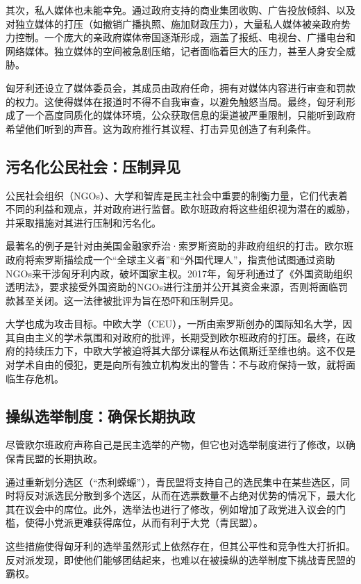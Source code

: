 其次，私人媒体也未能幸免。通过政府支持的商业集团收购、广告投放倾斜、以及对独立媒体的打压（如撤销广播执照、施加财政压力），大量私人媒体被亲政府势力控制。一个庞大的亲政府媒体帝国逐渐形成，涵盖了报纸、电视台、广播电台和网络媒体。独立媒体的空间被急剧压缩，记者面临着巨大的压力，甚至人身安全威胁。

匈牙利还设立了媒体委员会，其成员由政府任命，拥有对媒体内容进行审查和罚款的权力。这使得媒体在报道时不得不自我审查，以避免触怒当局。最终，匈牙利形成了一个高度同质化的媒体环境，公众获取信息的渠道被严重限制，只能听到政府希望他们听到的声音。这为政府推行其议程、打击异见创造了有利条件。

\subsection{污名化公民社会：压制异见}

公民社会组织（NGOs）、大学和智库是民主社会中重要的制衡力量，它们代表着不同的利益和观点，并对政府进行监督。欧尔班政府将这些组织视为潜在的威胁，并采取措施对其进行压制和污名化。

最著名的例子是针对由美国金融家乔治·索罗斯资助的非政府组织的打击。欧尔班政府将索罗斯描绘成一个“全球主义者”和“外国代理人”，指责他试图通过资助NGOs来干涉匈牙利内政，破坏国家主权。2017年，匈牙利通过了《外国资助组织透明法》，要求接受外国资助的NGOs进行注册并公开其资金来源，否则将面临罚款甚至关闭。这一法律被批评为旨在恐吓和压制异见。

大学也成为攻击目标。中欧大学（CEU），一所由索罗斯创办的国际知名大学，因其自由主义的学术氛围和对政府的批评，长期受到欧尔班政府的打压。最终，在政府的持续压力下，中欧大学被迫将其大部分课程从布达佩斯迁至维也纳。这不仅是对学术自由的侵犯，更是向所有独立机构发出的警告：不与政府保持一致，就将面临生存危机。

\subsection{操纵选举制度：确保长期执政}

尽管欧尔班政府声称自己是民主选举的产物，但它也对选举制度进行了修改，以确保青民盟的长期执政。

通过重新划分选区（“杰利蝾螈”），青民盟将支持自己的选民集中在某些选区，同时将反对派选民分散到多个选区，从而在选票数量不占绝对优势的情况下，最大化其在议会中的席位。此外，选举法也进行了修改，例如增加了政党进入议会的门槛，使得小党派更难获得席位，从而有利于大党（青民盟）。

这些措施使得匈牙利的选举虽然形式上依然存在，但其公平性和竞争性大打折扣。反对派发现，即使他们能够团结起来，也难以在被操纵的选举制度下挑战青民盟的霸权。

